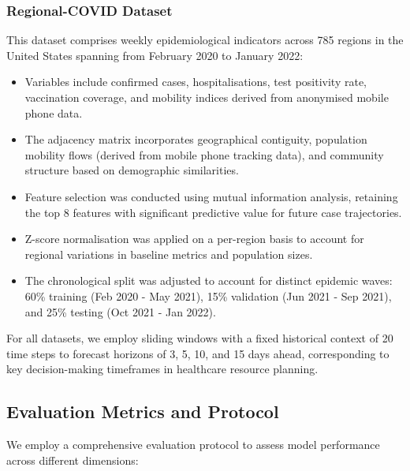 \documentclass[lettersize, journal]{IEEEtran}
\begin{document}
\subsubsection{Regional-COVID Dataset}
This dataset comprises weekly epidemiological indicators across 785 regions in the United States spanning from February 2020 to January 2022:

\begin{itemize}
    \item Variables include confirmed cases, hospitalisations, test positivity rate, vaccination coverage, and mobility indices derived from anonymised mobile phone data.
    
    \item The adjacency matrix incorporates geographical contiguity, population mobility flows (derived from mobile phone tracking data), and community structure based on demographic similarities.
    
    \item Feature selection was conducted using mutual information analysis, retaining the top 8 features with significant predictive value for future case trajectories.
    
    \item Z-score normalisation was applied on a per-region basis to account for regional variations in baseline metrics and population sizes.
    
    \item The chronological split was adjusted to account for distinct epidemic waves: 60\% training (Feb 2020 - May 2021), 15\% validation (Jun 2021 - Sep 2021), and 25\% testing (Oct 2021 - Jan 2022).
\end{itemize}

For all datasets, we employ sliding windows with a fixed historical context of 20 time steps to forecast horizons of 3, 5, 10, and 15 days ahead, corresponding to key decision-making timeframes in healthcare resource planning.

\subsection{Evaluation Metrics and Protocol}
We employ a comprehensive evaluation protocol to assess model performance across different dimensions:
\end{document}
